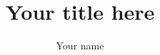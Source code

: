 \documentclass[modernstyle,12pt]{thesis}
\title{Your title here}
\author{Your name}{surname}
\begin{document}





\nocite{*}		%



\appendix	%


\end{document}
